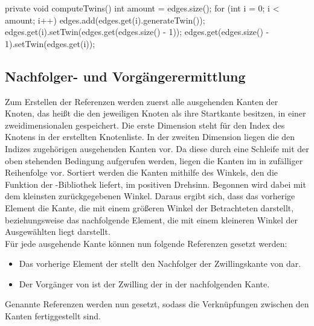 \begin{code}
private void computeTwins() {
	int amount = edges.size();
	for (int i = 0; i < amount; i++) {
		edges.add(edges.get(i).generateTwin());
		edges.get(i).setTwin(edges.get(edges.size() - 1));
		edges.get(edges.size() - 1).setTwin(edges.get(i));
	}
}
\end{code}

\subsection{Nachfolger- und Vorgängerermittlung}
Zum Erstellen der Referenzen werden zuerst alle ausgehenden Kanten der Knoten, das heißt die den jeweiligen Knoten als ihre Startkante besitzen, in einer zweidimensionalen  gespeichert.
Die erste Dimension steht für den Index des Knotens in der erstellten Knotenliste.
In der zweiten Dimension liegen die den Indizes zugehörigen ausgehenden Kanten vor.
Da diese durch eine  Schleife mit der oben stehenden Bedingung aufgerufen werden, liegen die Kanten im  in zufälliger Reihenfolge vor.
Sortiert werden die Kanten mithilfe des Winkels, den die Funktion  der -Bibliothek liefert, im positiven Drehsinn.
Begonnen wird dabei mit dem kleinsten zurückgegebenen Winkel.
Daraus ergibt sich, dass das vorherige Element die Kante, die mit einem größeren Winkel  der Betrachteten darstellt, beziehungsweise das nachfolgende Element, die mit einem kleineren Winkel  der Ausgewählten liegt darstellt. \\
Für jede ausgehende Kante  können nun folgende Referenzen gesetzt werden:

\begin{itemize}
	\item Das vorherige Element der  stellt den Nachfolger der Zwillingskante von  dar.
	\item Der Vorgänger von  ist der Zwilling der in der  nachfolgenden Kante.
\end{itemize}

Genannte Referenzen werden nun gesetzt, sodass die Verknüpfungen zwischen den Kanten fertiggestellt sind.

